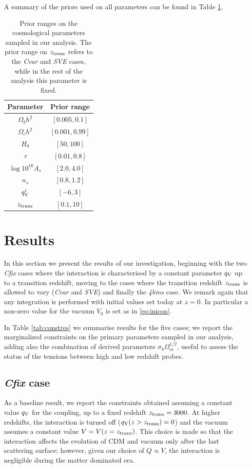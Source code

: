 \documentclass[a4paper,fleqn,usenatbib]{mnras}
\begin{document}
A summary of the priors used on all parameters can be found in Table \ref{tab:priors}.

\begin{table}
\centering
\begin{tabular}{|c|c|}
\hline
Parameter          & Prior range \\
\hline
$\Omega_bh^2$      &  $[0.005,0.1]$\\
$\Omega_ch^2$      &  $[0.001,0.99]$ \\
$H_0$              &  $[50,100]$\\
$\tau$             &  $[0.01,0.8]$\\
$\log{10^{10}A_s}$ &  $[2.0,4.0]$\\
$n_s$              &  $[0.8,1.2]$\\
$q^i_{\rm V}$      &  $[-6,3]$  \\
$z_{\rm trans}$    &  $[0.1,10]$ \\
\hline
\hline
\end{tabular}
\caption{Prior ranges on the cosmological parameters sampled in our analysis. The prior range on $z_{\rm trans}$ refers to the {\it Cvar} and {\it SVE} cases, while in the rest of the analysis this parameter is fixed.}\label{tab:priors}
\end{table}


\section{Results} \label{sec:results}
In this section we present the results of our investigation, beginning with the two {\it Cfix} cases where the interaction is characterised by a  constant  parameter $q_{\rm V}$  up to a transition redshift, moving to the cases where the transition redshift $z_{\rm trans}$ is allowed to vary ({\it Cvar} and {\it SVE}) and finally the {\it 4bins} case. We remark again that any integration is performed with initial values set today at $z=0$. In particular a non-zero value for the vacuum $V_0$ is set as in \eqref{eq:inicon}.

In Table \ref{tab:constres} we summarise results for the five cases; we report the marginalized constraints on the primary parameters sampled in our analysis, adding also the combination of derived parameters $\sigma_8\Omega_m^{1/2}$, useful to assess the status of the tensions between high and low redshift probes.

\subsection{{\it Cfix} case}
As a baseline result, we report the constraints obtained assuming a constant value $q_{\rm V}$ for the coupling, up to a fixed redshift $z_{\rm trans}=3000$. At higher redshifts, the interaction is turned off ($q_{\rm V}(z>z_{\rm trans})=0$) and the vacuum assumes a constant value $V=V(z=z_{\rm trans})$.  This choice is made so that the interaction affects the evolution of CDM and vacuum only after the last scattering surface; however, given our choice of $Q\propto V$, the interaction is negligible during the matter dominated era.
\end{document}
